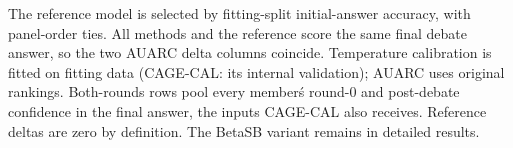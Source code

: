 \begin{table}[t]
{\begin{tabular}{@{}lrrrrrrrrrrrrrrrrrrrr@{}}
\bottomrule
\end{tabular}%
}
\vspace{2pt}
\parbox{\textwidth}{\footnotesize The reference model is selected by fitting-split initial-answer accuracy, with panel-order ties. All methods and the reference score the same final debate answer, so the two AUARC delta columns coincide. Temperature calibration is fitted on fitting data (CAGE-CAL: its internal validation); AUARC uses original rankings. Both-rounds rows pool every member\'s round-0 and post-debate confidence in the final answer, the inputs CAGE-CAL also receives. Reference deltas are zero by definition. The BetaSB variant remains in detailed results.}
\end{table}
